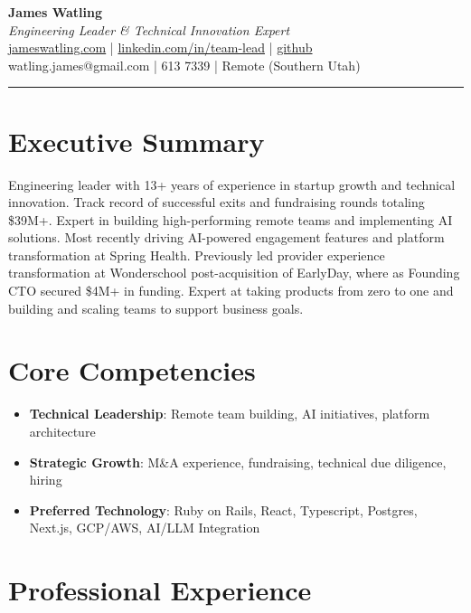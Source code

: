 \documentclass[letterpaper,10pt]{article}
\begin{document}
\begin{center}
    {\huge \textbf{James Watling}}\\[5pt]
    \textit{Engineering Leader \& Technical Innovation Expert}\\[5pt]
    \href{https://jameswatling.com}{jameswatling.com} \quad | \quad
    \href{https://www.linkedin.com/in/team-lead/}{linkedin.com/in/team-lead} \quad | \quad
    \href{https://github.com/JamesWatling/}{github}\\[3pt]
    watling.james@gmail.com \quad |  613 7339 \quad | \quad Remote (Southern Utah)
\end{center}


\hrule

\section*{Executive Summary}
Engineering leader with 13+ years of experience in startup growth and technical innovation. Track record of successful exits and fundraising rounds totaling \$39M+. Expert in building high-performing remote teams and implementing AI solutions. Most recently driving AI-powered engagement features and platform transformation at Spring Health. Previously led provider experience transformation at Wonderschool post-acquisition of EarlyDay, where as Founding CTO secured \$4M+ in funding. Expert at taking products from zero to one and building and scaling teams to support business goals.

\section*{Core Competencies}
\begin{itemize}[leftmargin=*, nosep]
    \item \textbf{Technical Leadership}: Remote team building, AI initiatives, platform architecture
    \item \textbf{Strategic Growth}: M\&A experience, fundraising, technical due diligence, hiring
    \item \textbf{Preferred Technology}: Ruby on Rails, React, Typescript, Postgres, Next.js, GCP/AWS, AI/LLM Integration
\end{itemize}

\section*{Professional Experience}
\end{document}
